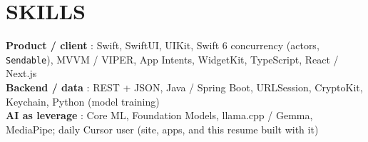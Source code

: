 \section{SKILLS}
 \begin{itemize}[leftmargin=0in, label={}]
    \small{\item{
     \textbf{Product / client} {: Swift, SwiftUI, UIKit, Swift 6 concurrency (actors, \texttt{Sendable}), MVVM / VIPER, App Intents, WidgetKit, TypeScript, React / Next.js} \vspace{1pt} \\
     \textbf{Backend / data} {: REST + JSON, Java / Spring Boot, URLSession, CryptoKit, Keychain, Python (model training)} \vspace{1pt} \\
     \textbf{AI as leverage} {: Core ML, Foundation Models, llama.cpp / Gemma, MediaPipe; daily Cursor user (site, apps, and this resume built with it)}
    }}
 \end{itemize}


